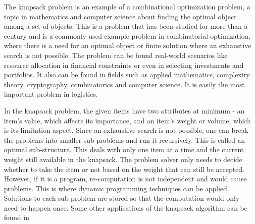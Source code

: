 \documentclass[12pt]{article}
\begin{document}
The knapsack problem is an example of a combinational optimization problem, a topic in mathematics and computer science about finding the optimal object among a set of objects. This is a problem that has been studied for more than a century and is a commonly used example problem in combinatorial optimization, where there is a need for an optimal object or finite solution where an exhaustive search is not possible. The problem can be found real-world scenarios like resource allocation in financial constraints or even in selecting investments and portfolios. It also can be found in fields such as applied mathematics, complexity theory, cryptography, combinatorics and computer science. It is easily the most important problem in logistics.

In the knapsack problem, the given items have two attributes at minimum - an item’s value, which affects its importance, and an item’s weight or volume, which is its limitation aspect. Since an exhaustive search is not possible, one can break the problems into smaller sub-problems and run it recursively. This is called an optimal sub-structure. This deals with only one item at a time and the current weight still available in the knapsack. The problem solver only needs to decide whether to take the item or not based on the weight that can still be accepted. However, if it is a program, re-computation is not independent and would cause problems. This is where dynamic programming techniques can be applied. Solutions to each sub-problem are stored so that the computation would only need to happen once. Some other applications of the knapsack algorithm can be found in \newline
\end{document}

